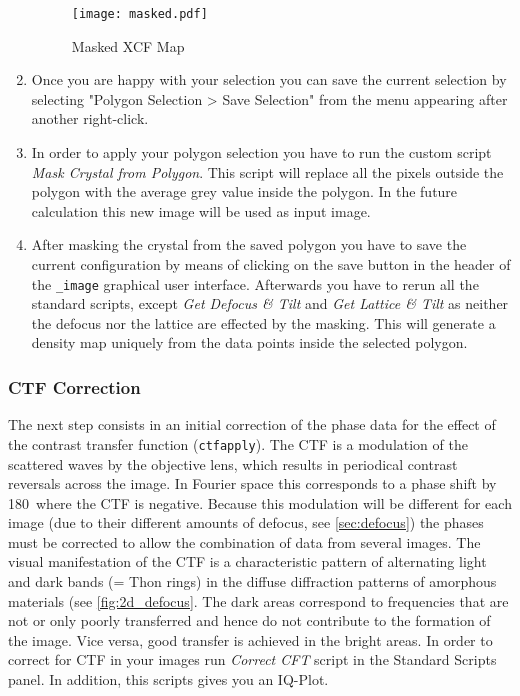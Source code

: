 \begin{enumerate}
	\begin{figure}[H]
		\centering
		\texttt{[image: masked.pdf]}
		\caption{Masked XCF Map}
		\label{fig:mask_3}
	\end{figure}
	
	\item Once you are happy with your selection you can save the current selection by selecting "Polygon Selection > Save Selection" from the menu appearing after another right-click.

	\item In order to apply your polygon selection you have to run the custom script \textit{Mask Crystal from Polygon}. This script will replace all the pixels outside the polygon with the average grey value inside the polygon. In the future calculation this new image will be used as input image.
	
	\item After masking the crystal from the saved polygon you have to save the current configuration by means of clicking on the save button in the header of the {\twodx}\texttt{\_image} graphical user interface. Afterwards you have to rerun all the standard scripts, except \textit{Get Defocus \& Tilt} and  \textit{Get Lattice \& Tilt} as neither the defocus nor the lattice are effected by the masking. This will generate a density map uniquely from the data points inside the selected polygon.
	
\end{enumerate}



\subsubsection{CTF Correction}
\label{sec:ctf}

The next step consists in an initial correction of the phase data for the effect of the contrast transfer function (\texttt{ctfapply}). The CTF is a modulation of the scattered waves by the objective lens, which results in periodical contrast reversals across the image. In Fourier space this corresponds to a phase shift by 180\textdegree~where the CTF is negative. Because this modulation will be different for each image (due to their different amounts of defocus, see \autoref{sec:defocus}) the phases must be corrected to allow the combination of data from several images. The visual manifestation of the CTF is a characteristic pattern of alternating light and dark bands (= Thon rings) in the diffuse diffraction patterns of amorphous materials (see \autoref{fig:2d_defocus}. The dark areas correspond to frequencies that are not or only poorly transferred and hence do not contribute to the formation of the image. Vice versa, good transfer is achieved in the bright areas. 
In order to correct for CTF in your images run \textit{Correct CFT} script in the Standard Scripts panel. In addition, this scripts gives you an IQ-Plot. 

